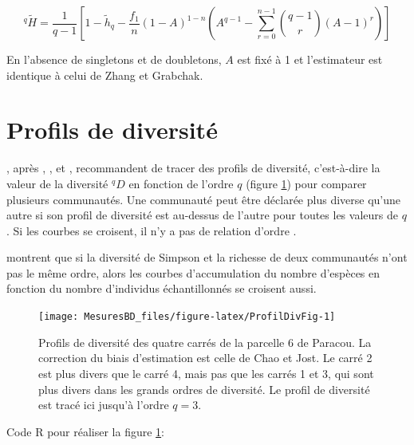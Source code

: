 \documentclass[
  11pt,
  american,
  a4paper,
  extrafontsizes,onecolumn,openright
  ]{memoir}
\begin{document}
\begin{equation}
  ^{q}{\tilde{H}}
    = \frac{1}{q - 1} \left[ 
     1 - \tilde{h}_q - \frac{f_1}{n}{\left( 1 - A \right)}^{1 - n} 
     \left( A^{q - 1} - \sum_{r=0}^{n-1}{\binom{q - 1}{r} {\left( A - 1 \right)}^r} \right) 
    \right]
\end{equation}

En l'absence de singletons et de doubletons, \(A\) est fixé à 1 et l'estimateur est identique à celui de Zhang et Grabchak.

\section{Profils de diversité}\label{profils-de-diversituxe9}

\textcite{Leinster2012}, après \textcite{Hill1973}, \textcite{Patil1982}, \textcite{Tothmeresz1995} et \textcite{Kindt2006}, recommandent de tracer des profils de diversité, c'est-à-dire la valeur de la diversité \(^{q}\!D\) en fonction de l'ordre \(q\) (figure \ref{fig:ProfilDivFig}) pour comparer plusieurs communautés.
Une communauté peut être déclarée plus diverse qu'une autre si son profil de diversité est au-dessus de l'autre pour toutes les valeurs de \(q\).
Si les courbes se croisent, il n'y a pas de relation d'ordre \autocite{Tothmeresz1995}.

\textcite{Lande2000} montrent que si la diversité de Simpson et la richesse de deux communautés n'ont pas le même ordre, alors les courbes d'accumulation du nombre d'espèces en fonction du nombre d'individus échantillonnés se croisent aussi.



\scriptsize

\begin{figure}

{\centering \texttt{[image: MesuresBD\_files/figure-latex/ProfilDivFig-1]} 

}

\caption{Profils de diversité des quatre carrés de la parcelle 6 de Paracou. La correction du biais d'estimation est celle de Chao et Jost. Le carré 2 est plus divers que le carré 4, mais pas que les carrés 1 et 3, qui sont plus divers dans les grands ordres de diversité. Le profil de diversité est tracé ici jusqu'à l'ordre \(q = 3\).}\label{fig:ProfilDivFig}
\end{figure}

\normalsize

Code R pour réaliser la figure \ref{fig:ProfilDivFig}:
\end{document}
